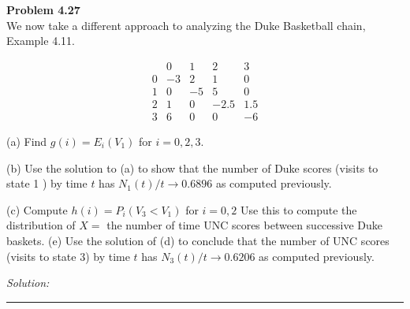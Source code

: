 \documentclass[a4paper, 11pt]{article}
\newenvironment{problem}[2][Problem]
    { \begin{mdframed}[backgroundcolor=gray!20] \textbf{#1 #2} \\}
    {  \end{mdframed}}
\newenvironment{solution}
    {\textit{Solution:}}
    {}
\begin{document}
\begin{problem}{4.27}
We now take a different approach to analyzing the Duke Basketball chain, Example 4.11.

$$
\begin{array}{ccccc} 
& 0 & 1 & 2 & 3 \\
0 & -3 & 2 & 1 & 0 \\
1 & 0 & -5 & 5 & 0 \\
2 & 1 & 0 & -2.5 & 1.5 \\
3 & 6 & 0 & 0 & -6
\end{array}
$$

(a) Find $g(i)=E_{i}\left(V_{1}\right)$ for $i=0,2,3 .$ 

(b) Use the solution to (a) to show that the number of Duke scores (visits to state 1 ) by time $t$ has $N_{1}(t) / t \rightarrow 0.6896$ as computed previously. 

(c) Compute $h(i)=P_{i}\left(V_{3}<V_{1}\right)$ for $i=0,2$ Use this to compute the distribution of $X=$ the number of time UNC scores between successive Duke baskets. (e) Use the solution of (d) to conclude that the number of UNC scores (visits to state 3) by time $t$ has $N_{3}(t) / t \rightarrow 0.6206$ as computed previously.

\end{problem}
\begin{solution}


\end{solution} 
%
\noindent\rule{7in}{2.8pt}
\end{document}
